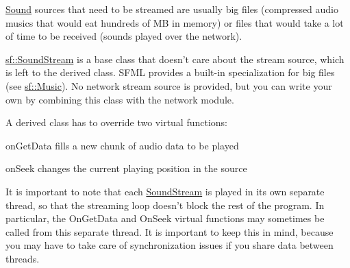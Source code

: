 \hyperlink{classsf_1_1_sound}{Sound} sources that need to be streamed are usually big files (compressed audio musics that would eat hundreds of M\+B in memory) or files that would take a lot of time to be received (sounds played over the network).

\hyperlink{classsf_1_1_sound_stream}{sf\+::\+Sound\+Stream} is a base class that doesn't care about the stream source, which is left to the derived class. S\+F\+M\+L provides a built-\/in specialization for big files (see \hyperlink{classsf_1_1_music}{sf\+::\+Music}). No network stream source is provided, but you can write your own by combining this class with the network module.

A derived class has to override two virtual functions\+: \begin{DoxyItemize}
\item on\+Get\+Data fills a new chunk of audio data to be played \item on\+Seek changes the current playing position in the source\end{DoxyItemize}
It is important to note that each \hyperlink{classsf_1_1_sound_stream}{Sound\+Stream} is played in its own separate thread, so that the streaming loop doesn't block the rest of the program. In particular, the On\+Get\+Data and On\+Seek virtual functions may sometimes be called from this separate thread. It is important to keep this in mind, because you may have to take care of synchronization issues if you share data between threads.


